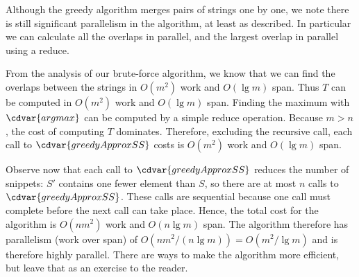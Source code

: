 \begin{cluster}
\label{grp:nt:genome::although}

\begin{note}
\label{nt:genome::although}
Although the greedy algorithm merges pairs of strings one by one, we
note there is still significant parallelism in the algorithm, at least
as described.  In particular we can calculate all the overlaps in
parallel, and the largest overlap in parallel using a reduce.

\end{note}
\end{cluster}

\begin{cluster}
\label{grp:grm:genome::cost}

\begin{gram}
\label{grm:genome::cost}
From the analysis of our brute-force algorithm, we know that we can
find the overlaps between the strings in $O(m^2)$ work and $O(\lg{m})$
span.
Thus $T$ can be computed in $O(m^2)$ work and $O(\lg{m})$ span.
Finding the maximum with $\cdvar{argmax}$ can be computed by a simple reduce operation.
Because $m > n$, the cost of computing $T$ dominates. 
Therefore, excluding the recursive
call, each call to $\cdvar{greedyApproxSS}$ costs is $O(m^2)$ work and
$O(\lg{m})$ span.

Observe now that each call to $\cdvar{greedyApproxSS}$ reduces the
number of snippets: $S'$ contains one fewer element than $S$, so
there are at most $n$ calls to $\cdvar{greedyApproxSS}$.  
These calls are sequential because one call must complete before the
next call can take place.  
Hence, the total cost for the algorithm is $O(n m^2)$ work and $O(n
\lg m)$ span.  
The algorithm therefore has parallelism (work over span) of $O(n m^2 / (n \lg m)) = O(m^2
/ \lg m)$ and is therefore highly parallel.
There are ways to make the algorithm more efficient, but leave that as
an exercise to the reader.

\end{gram}
\end{cluster}

